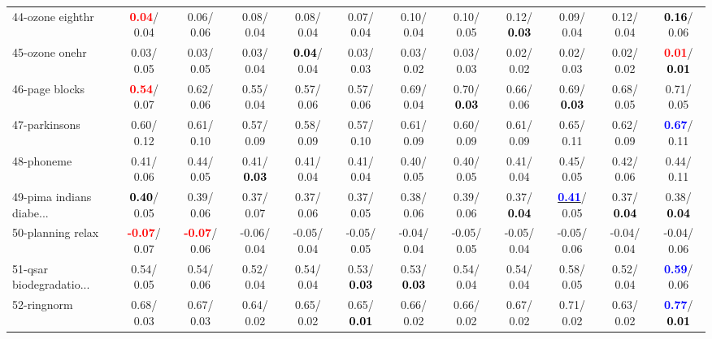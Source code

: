 \begin{table}[h]
\begin{center}
{\begin{tabular}{lc|c|c|c|c|c|c|c|c|c|c}
44-ozone eighthr & \textcolor{red}{\textbf{  0.04}}/  0.04 &   0.06/  0.06 &   0.08/  0.04 &   0.08/  0.04 &   0.07/  0.04 &   0.10/  0.04 &   0.10/  0.05 &   0.12/\textcolor{black}{\textbf{  0.03}} &   0.09/  0.04 &   0.12/  0.04 & \textcolor{black}{\textbf{  0.16}}/  0.06 \\
45-ozone onehr &   0.03/  0.05 &   0.03/  0.05 &   0.03/  0.04 & \textcolor{black}{\textbf{  0.04}}/  0.04 &   0.03/  0.03 &   0.03/  0.02 &   0.03/  0.03 &   0.02/  0.02 &   0.02/  0.03 &   0.02/  0.02 & \textcolor{red}{\textbf{  0.01}}/\textcolor{black}{\textbf{  0.01}} \\
46-page blocks & \textcolor{red}{\textbf{  0.54}}/  0.07 &   0.62/  0.06 &   0.55/  0.04 &   0.57/  0.06 &   0.57/  0.06 &   0.69/  0.04 &   0.70/\textcolor{black}{\textbf{  0.03}} &   0.66/  0.06 &   0.69/\textcolor{black}{\textbf{  0.03}} &   0.68/  0.05 &   0.71/  0.05 \\ \hline
47-parkinsons &   0.60/  0.12 &   0.61/  0.10 &   0.57/  0.09 &   0.58/  0.09 &   0.57/  0.10 &   0.61/  0.09 &   0.60/  0.09 &   0.61/  0.09 &   0.65/  0.11 &   0.62/  0.09 & \textcolor{blue}{\textbf{  0.67}}/  0.11 \\
48-phoneme &   0.41/  0.06 &   0.44/  0.05 &   0.41/\textcolor{black}{\textbf{  0.03}} &   0.41/  0.04 &   0.41/  0.04 &   0.40/  0.05 &   0.40/  0.05 &   0.41/  0.04 &   0.45/  0.05 &   0.42/  0.06 &   0.44/  0.11 \\
49-pima indians diabe... & \textcolor{black}{\textbf{  0.40}}/  0.05 &   0.39/  0.06 &   0.37/  0.07 &   0.37/  0.06 &   0.37/  0.05 &   0.38/  0.06 &   0.39/  0.06 &   0.37/\textcolor{black}{\textbf{  0.04}} & \underline{\textcolor{blue}{\textbf{  0.41}}}/  0.05 &   0.37/\textcolor{black}{\textbf{  0.04}} &   0.38/\textcolor{black}{\textbf{  0.04}} \\
50-planning relax & \textcolor{red}{\textbf{ -0.07}}/  0.07 & \textcolor{red}{\textbf{ -0.07}}/  0.06 &  -0.06/  0.04 &  -0.05/  0.04 &  -0.05/  0.05 &  -0.04/  0.04 &  -0.05/  0.05 &  -0.05/  0.04 &  -0.05/  0.06 &  -0.04/  0.04 &  -0.04/  0.06 \\
51-qsar biodegradatio... &   0.54/  0.05 &   0.54/  0.06 &   0.52/  0.04 &   0.54/  0.04 &   0.53/\textcolor{black}{\textbf{  0.03}} &   0.53/\textcolor{black}{\textbf{  0.03}} &   0.54/  0.04 &   0.54/  0.04 &   0.58/  0.05 &   0.52/  0.04 & \textcolor{blue}{\textbf{  0.59}}/  0.06 \\
52-ringnorm &   0.68/  0.03 &   0.67/  0.03 &   0.64/  0.02 &   0.65/  0.02 &   0.65/\textcolor{black}{\textbf{  0.01}} &   0.66/  0.02 &   0.66/  0.02 &   0.67/  0.02 &   0.71/  0.02 &   0.63/  0.02 & \textcolor{blue}{\textbf{  0.77}}/\textcolor{black}{\textbf{  0.01}} \\

\end{tabular}}
\end{center}
\end{table}

